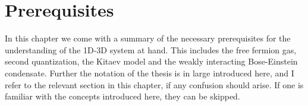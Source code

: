
\chapter{Prerequisites} %

\label{Chapter2} %


In this chapter we come with a summary of the necessary prerequisites for the understanding of the 1D-3D system at hand. This includes the free fermion gas, second quantization, the Kitaev model and the weakly interacting Bose-Einstein condensate. Further the notation of the thesis is in large introduced here, and I refer to the relevant section in this chapter, if any confusion should arise. If one is familiar with the concepts introduced here, they can be skipped. 

